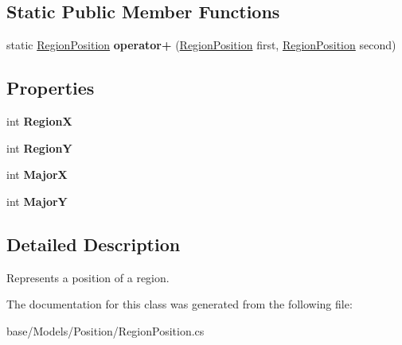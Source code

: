 \subsection*{Static Public Member Functions}
\begin{DoxyCompactItemize}
\item 
\hypertarget{classCore_1_1Models_1_1RegionPosition_aab54c93c6d1a98929101e97539d3a0f7}{static \hyperlink{classCore_1_1Models_1_1RegionPosition}{Region\-Position} {\bfseries operator+} (\hyperlink{classCore_1_1Models_1_1RegionPosition}{Region\-Position} first, \hyperlink{classCore_1_1Models_1_1RegionPosition}{Region\-Position} second)}\label{classCore_1_1Models_1_1RegionPosition_aab54c93c6d1a98929101e97539d3a0f7}

\end{DoxyCompactItemize}
\subsection*{Properties}
\begin{DoxyCompactItemize}
\item 
\hypertarget{classCore_1_1Models_1_1RegionPosition_a3558f91a2b72169d93722b9787abdf10}{int {\bfseries Region\-X}}\label{classCore_1_1Models_1_1RegionPosition_a3558f91a2b72169d93722b9787abdf10}

\item 
\hypertarget{classCore_1_1Models_1_1RegionPosition_ad6286a611b7ae561ac86a70dc68b10f2}{int {\bfseries Region\-Y}}\label{classCore_1_1Models_1_1RegionPosition_ad6286a611b7ae561ac86a70dc68b10f2}

\item 
\hypertarget{classCore_1_1Models_1_1RegionPosition_a98870c2d638d7d399b1ef1a922b91898}{int {\bfseries Major\-X}}\label{classCore_1_1Models_1_1RegionPosition_a98870c2d638d7d399b1ef1a922b91898}

\item 
\hypertarget{classCore_1_1Models_1_1RegionPosition_a1a50c82dbe48a3fa60df6b9f44a71c2c}{int {\bfseries Major\-Y}}\label{classCore_1_1Models_1_1RegionPosition_a1a50c82dbe48a3fa60df6b9f44a71c2c}

\end{DoxyCompactItemize}


\subsection{Detailed Description}
Represents a position of a region. 



The documentation for this class was generated from the following file\-:\begin{DoxyCompactItemize}
\item 
base/\-Models/\-Position/Region\-Position.\-cs\end{DoxyCompactItemize}
